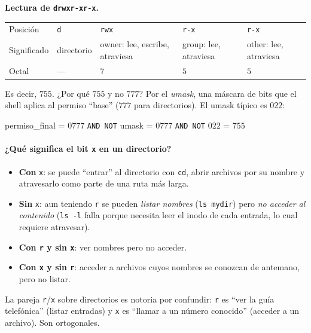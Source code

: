 \documentclass[11pt,a4paper]{article}
\begin{document}
\textbf{Lectura de \texttt{drwxr-xr-x}.}

\begin{center}
\small
\begin{tabular}{@{}lllll@{}}
\toprule
Posición & \texttt{d} & \texttt{rwx} & \texttt{r-x} & \texttt{r-x} \\
Significado & directorio & owner: lee, escribe, atraviesa & group: lee, atraviesa & other: lee, atraviesa \\
Octal & --- & $7$ & $5$ & $5$ \\
\bottomrule
\end{tabular}
\end{center}

Es decir, $755$. ¿Por qué $755$ y no $777$? Por el \emph{umask},
una máscara de bits que el shell aplica al permiso ``base''
($777$ para directorios). El umask típico es $022$:

\quad permiso\_final = $0777$ \texttt{AND NOT} umask = $0777$ \texttt{AND NOT} $022$ = $755$

\paragraph{¿Qué significa el bit \texttt{x} en un directorio?}

\begin{itemize}[leftmargin=*]
    \item \textbf{Con} \texttt{x}: se puede ``entrar'' al directorio
        con \texttt{cd}, abrir archivos por su nombre y atravesarlo
        como parte de una ruta más larga.
    \item \textbf{Sin} \texttt{x}: aun teniendo \texttt{r} se pueden
        \emph{listar nombres} (\texttt{ls mydir}) pero \emph{no acceder
        al contenido} (\texttt{ls -l} falla porque necesita leer el
        inodo de cada entrada, lo cual requiere atravesar).
    \item \textbf{Con \texttt{r} y sin \texttt{x}}: ver nombres pero
        no acceder.
    \item \textbf{Con \texttt{x} y sin \texttt{r}}: acceder a archivos
        cuyos nombres se conozcan de antemano, pero no listar.
\end{itemize}

\begin{idea}
La pareja \texttt{r}/\texttt{x} sobre directorios es notoria por
confundir: \texttt{r} es ``ver la guía telefónica'' (listar entradas)
y \texttt{x} es ``llamar a un número conocido'' (acceder a un
archivo). Son ortogonales.
\end{idea}
\end{document}
